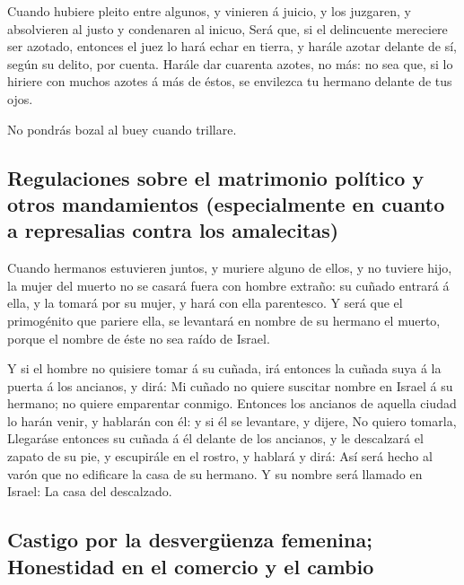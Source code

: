  Cuando hubiere pleito entre algunos, y vinieren á juicio,
y los juzgaren, y absolvieren al justo y condenaren al inicuo,
 Será que, si el delincuente mereciere ser azotado,
entonces el juez lo hará echar en tierra, y harále azotar delante de sí,
según su delito, por cuenta.  Harále dar cuarenta azotes,
no más: no sea que, si lo hiriere con muchos azotes á más de éstos, se
envilezca tu hermano delante de tus ojos.

 No pondrás bozal al buey cuando trillare.

\hypertarget{regulaciones-sobre-el-matrimonio-poluxedtico-y-otros-mandamientos-especialmente-en-cuanto-a-represalias-contra-los-amalecitas}{%
\subsection{Regulaciones sobre el matrimonio político y otros
mandamientos (especialmente en cuanto a represalias contra los
amalecitas)}\label{regulaciones-sobre-el-matrimonio-poluxedtico-y-otros-mandamientos-especialmente-en-cuanto-a-represalias-contra-los-amalecitas}}

 Cuando hermanos estuvieren juntos, y muriere alguno de
ellos, y no tuviere hijo, la mujer del muerto no se casará fuera con
hombre extraño: su cuñado entrará á ella, y la tomará por su mujer, y
hará con ella parentesco.  Y será que el primogénito que
pariere ella, se levantará en nombre de su hermano el muerto, porque el
nombre de éste no sea raído de Israel.

 Y si el hombre no quisiere tomar á su cuñada, irá
entonces la cuñada suya á la puerta á los ancianos, y dirá: Mi cuñado no
quiere suscitar nombre en Israel á su hermano; no quiere emparentar
conmigo.  Entonces los ancianos de aquella ciudad lo harán
venir, y hablarán con él: y si él se levantare, y dijere, No quiero
tomarla,  Llegaráse entonces su cuñada á él delante de los
ancianos, y le descalzará el zapato de su pie, y escupirále en el
rostro, y hablará y dirá: Así será hecho al varón que no edificare la
casa de su hermano.  Y su nombre será llamado en Israel:
La casa del descalzado.

\hypertarget{castigo-por-la-desverguxfcenza-femenina-honestidad-en-el-comercio-y-el-cambio}{%
\subsection{Castigo por la desvergüenza femenina; Honestidad en el
comercio y el
cambio}\label{castigo-por-la-desverguxfcenza-femenina-honestidad-en-el-comercio-y-el-cambio}}

